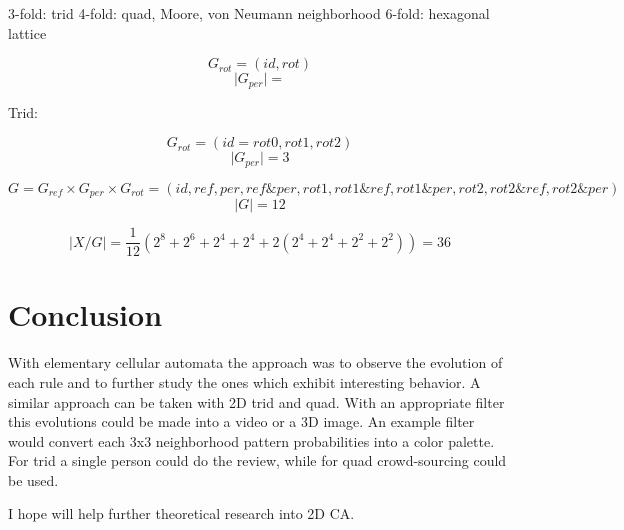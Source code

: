 \documentclass{ijuc}
\begin{document}
3-fold: trid
4-fold: quad, Moore, von Neumann neighborhood
6-fold: hexagonal lattice

\[ G_{rot} = (id, rot) \]
\[ \vert G_{per} \vert =  \]

Trid:

\[ G_{rot} = (id=rot0, rot1, rot2) \]
\[ \vert G_{per} \vert = 3 \]

\[ G = G_{ref} \times G_{per} \times G_{rot} = (id, ref, per, ref \& per, rot1, rot1 \& ref, rot1 \& per, rot2, rot2 \& ref, rot2 \& per) \]
\[ \vert G \vert = 12 \]

\[ |X/G| = \frac{1}{12} (2^8 + 2^6 + 2^4 + 2^4 + 2 (2^4 + 2^4 + 2^2 + 2^2)) = 36 \]

\section{Conclusion}

With elementary cellular automata the approach was to observe the evolution of
each rule and to further study the ones which exhibit interesting behavior.
A similar approach can be taken with 2D trid and quad. With an appropriate filter
this evolutions could be made into a video or a 3D image. An example filter would
convert each 3x3 neighborhood pattern probabilities into a color palette. For trid
a single person could do the review, while for quad crowd-sourcing could be used.

I hope will help further theoretical research into 2D CA.



\appendix 
\end{document}
